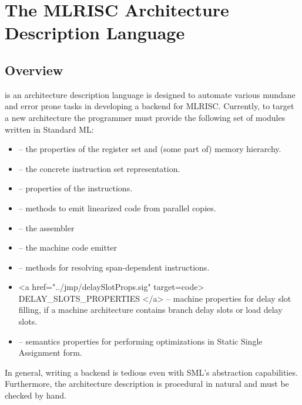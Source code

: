 \section{The MLRISC Architecture Description Language}

\subsection{ Overview }

 is an architecture description language 
is designed to automate
various mundane and error prone tasks in developing a backend for 
MLRISC.  Currently, to target a new
architecture the programmer must provide the following set of modules
written in Standard ML:

\begin{itemize}
  \item {} -- 
   the properties of the register set and (some part of) memory hierarchy. 
  \item {} -- 
   the concrete instruction set representation.
  \item {}  --
   properties of the instructions.
  \item {} --
   methods to emit linearized code from parallel copies.
  \item {} --
   the assembler
  \item {} --
   the machine code emitter
  \item {} --
   methods for resolving span-dependent instructions. 
  \item <a href="../jmp/delaySlotProps.sig" target=code> DELAY_SLOTS_PROPERTIES 
        </a> -- machine properties for delay slot filling, if a machine 
    architecture contains branch delay slots or load delay slots.
  \item {} --
    semantics properties for performing optimizations in Static Single
  Assignment form.
\end{itemize}

In general, writing a backend is tedious even with  
SML's abstraction capabilities. 
Furthermore, the architecture description is procedural in natural 
and must be checked by hand.  

